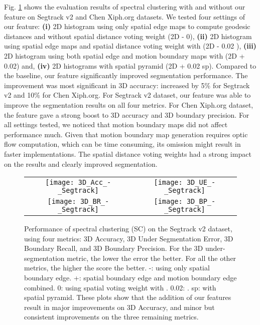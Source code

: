 \documentclass[runningheads]{llncs}
\begin{document}
Fig. \ref{VSS_seg} shows the evaluation results of spectral clustering with and without our feature on Segtrack v2 and Chen Xiph.org datasets. We tested four settings of our feature: \textbf{(i)} 2D histogram using only spatial edge maps to compute geodesic distances and without spatial distance voting weight (2D - 0), \textbf{(ii)} 2D histogram using spatial edge maps and spatial distance voting weight with  (2D - 0.02 ), \textbf{(iii)} 2D histogram using both spatial edge and motion boundary maps with  (2D + 0.02) and, \textbf{(iv)} 2D histograms with spatial pyramid (2D + 0.02 sp). Compared to the baseline, our feature significantly improved  segmentation performance. The improvement was most significant in 3D accuracy: increased by 5\% for Segtrack v2 and 10\% for Chen Xiph.org. For Segtrack v2 dataset, our feature was able to improve the segmentation results on all four metrics. For Chen Xiph.org dataset, the feature gave a strong boost to 3D accuracy and 3D boundary precision. For all settings tested, we noticed that motion boundary maps did not affect performance much. Given that motion boundary map generation requires optic flow computation, which can be time consuming, its omission might result in faster implementations. The spatial distance voting weights had a strong impact on the results and clearly improved segmentation.
\begin{figure}[]
\begin{center}
\begin{adjustbox}{max width=0.9\textwidth }
\begin{tabular}{cc}
\texttt{[image: 3D\_Acc\_-\_Segtrack]}&
\texttt{[image: 3D\_UE\_-\_Segtrack]}\\
\texttt{[image: 3D\_BR\_-\_Segtrack]}&
\texttt{[image: 3D\_BP\_-\_Segtrack]}\\
\end{tabular}
\end{adjustbox}
\end{center}
\caption{Performance of spectral clustering (SC) \cite{Galasso2013} on the Segtrack v2 dataset, using four metrics: 3D Accuracy, 3D Under Segmentation Error, 3D Boundary Recall, and 3D Boundary Precision. For the 3D under-segmentation metric, the lower the error the better. For all the other metrics, the higher the score the better. -: using only spatial boundary edge. +: spatial boundary edge and motion boundary edge combined. 0: using spatial voting weight with . 0.02: . sp: with spatial pyramid. These plots show that the addition of our features result in major improvements on 3D Accuracy, and minor but consistent improvements on the three remaining metrics.}
\label{VSS_seg}
\end{figure}
\end{document}
